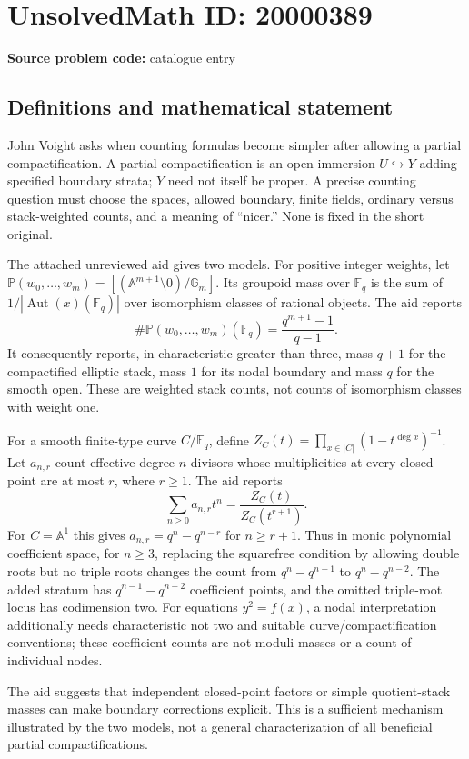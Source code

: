 \documentclass[11pt]{article}
\newcommand{\F}{\mathbb{F}}
\newcommand{\A}{\mathbb{A}}
\newcommand{\PP}{\mathbb{P}}
\begin{document}
\section*{UnsolvedMath ID: 20000389}
\textbf{Source problem code:} catalogue entry
\subsection{Definitions and mathematical statement}
John Voight asks when counting formulas become simpler after allowing a partial compactification. A partial compactification is an open immersion $U\hookrightarrow Y$ adding specified boundary strata; $Y$ need not itself be proper. A precise counting question must choose the spaces, allowed boundary, finite fields, ordinary versus stack-weighted counts, and a meaning of ``nicer.'' None is fixed in the short original.

The attached unreviewed aid gives two models. For positive integer weights, let $\PP(w_0,\ldots,w_m)=[(\A^{m+1}\setminus0)/\mathbb G_m]$. Its groupoid mass over $\F_q$ is the sum of $1/|\operatorname{Aut}(x)(\F_q)|$ over isomorphism classes of rational objects. The aid reports
\[
\#\PP(w_0,\ldots,w_m)(\F_q)=\frac{q^{m+1}-1}{q-1}.
\]
It consequently reports, in characteristic greater than three, mass $q+1$ for the compactified elliptic stack, mass $1$ for its nodal boundary and mass $q$ for the smooth open. These are weighted stack counts, not counts of isomorphism classes with weight one.

For a smooth finite-type curve $C/\F_q$, define $Z_C(t)=\prod_{x\in|C|}(1-t^{\deg x})^{-1}$. Let $a_{n,r}$ count effective degree-$n$ divisors whose multiplicities at every closed point are at most $r$, where $r\ge1$. The aid reports
\[
\sum_{n\ge0}a_{n,r}t^n=\frac{Z_C(t)}{Z_C(t^{r+1})}.
\]
For $C=\A^1$ this gives $a_{n,r}=q^n-q^{n-r}$ for $n\ge r+1$. Thus in monic polynomial coefficient space, for $n\ge3$, replacing the squarefree condition by allowing double roots but no triple roots changes the count from $q^n-q^{n-1}$ to $q^n-q^{n-2}$. The added stratum has $q^{n-1}-q^{n-2}$ coefficient points, and the omitted triple-root locus has codimension two. For equations $y^2=f(x)$, a nodal interpretation additionally needs characteristic not two and suitable curve/compactification conventions; these coefficient counts are not moduli masses or a count of individual nodes.

The aid suggests that independent closed-point factors or simple quotient-stack masses can make boundary corrections explicit. This is a sufficient mechanism illustrated by the two models, not a general characterization of all beneficial partial compactifications.
\end{document}
